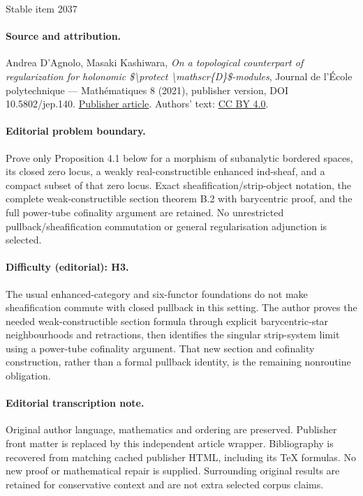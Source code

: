 \documentclass[11pt]{article}
\numberwithin{equation}{section}
\theoremstyle{plain}
\theoremstyle{definition}
\begin{document}
\begin{center}{\Large Stable item 2037}\end{center}
\paragraph{Source and attribution.}
Andrea D’Agnolo, Masaki Kashiwara, \emph{On a topological counterpart of regularization for holonomic \$\textbackslash{}protect \textbackslash{}mathscr\{D\}\$-modules}, Journal de l’École polytechnique — Mathématiques 8 (2021), publisher version, DOI 10.5802/jep.140. \href{https://jep.centre-mersenne.org/articles/10.5802/jep.140/}{Publisher article}. Authors' text: \href{https://creativecommons.org/licenses/by/4.0/}{CC BY 4.0}.
\paragraph{Editorial problem boundary.}
Prove only Proposition 4.1 below for a morphism of subanalytic bordered spaces, its closed zero locus, a weakly real-constructible enhanced ind-sheaf, and a compact subset of that zero locus. Exact sheafification/strip-object notation, the complete weak-constructible section theorem B.2 with barycentric proof, and the full power-tube cofinality argument are retained. No unrestricted pullback/sheafification commutation or general regularisation adjunction is selected.
\paragraph{Difficulty (editorial): H3.}
The usual enhanced-category and six-functor foundations do not make sheafification commute with closed pullback in this setting. The author proves the needed weak-constructible section formula through explicit barycentric-star neighbourhoods and retractions, then identifies the singular strip-system limit using a power-tube cofinality argument. That new section and cofinality construction, rather than a formal pullback identity, is the remaining nonroutine obligation.
\paragraph{Editorial transcription note.}
Original author language, mathematics and ordering are preserved. Publisher front matter is replaced by this independent article wrapper. Bibliography is recovered from matching cached publisher HTML, including its TeX formulas. No new proof or mathematical repair is supplied. Surrounding original results are retained for conservative context and are not extra selected corpus claims.
\clearpage
\end{document}
